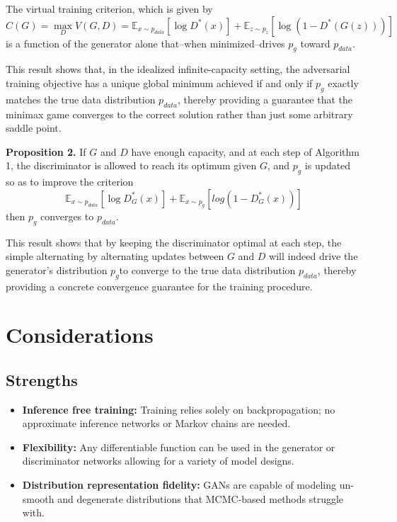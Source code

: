 \documentclass[10pt]{article}
\begin{document}
\vspace{0.5cm}
\noindent
The virtual training criterion, which is given by
\[
    C(G) =  \max_D V(G, D) = \mathbb{E}_{x \sim p_{data}}[\log D^*(x)] + \mathbb{E}_{z \sim p_z}[\log(1 - D^*(G(z)))]
\]
is a function of the generator alone that–when minimized–drives \(p_g\) toward \(p_{data}\).

This result shows that, in the idealized infinite-capacity setting, the adversarial training objective has a unique global minimum achieved if and only if \(p_g\) exactly matches the true data distribution \(p_{data}\), thereby providing a guarantee that the minimax game converges to the correct solution rather than just some arbitrary saddle point.

\vspace{0.5cm}
\noindent
\textbf{Proposition 2.} If \(G\) and \(D\) have enough capacity, and at each step of Algorithm 1, the discriminator is allowed to reach its optimum given \(G\), and \(p_g\) is updated so as to improve the criterion
\[
    \mathbb{E}_{x \sim p_{data}}[\log D^*_G(x)] + \mathbb{E}_{x \sim p_g}[log(1 - D^*_G(x))]
\]
then \(p_g\) converges to \(p_{data}\).

\vspace{0.5cm}

\noindent
This result shows that by keeping the discriminator optimal at each step, the simple alternating by alternating updates between \(G\) and \(D\) will indeed drive the generator's distribution \(p_g\)to converge to the true data distribution \(p_{data}\), thereby providing a concrete convergence guarantee for the training procedure.


\section*{Considerations}
\subsection*{Strengths}
\begin{itemize}
    \item \textbf{Inference free training:} Training relies solely on backpropagation; no approximate inference networks or Markov chains are needed.
    \item \textbf{Flexibility:} Any differentiable function can be used in the generator or discriminator networks allowing for a variety of model designs.
    \item \textbf{Distribution representation fidelity:} GANs are capable of modeling un-smooth and degenerate distributions that MCMC-based methods struggle with.
\end{itemize}
\end{document}
